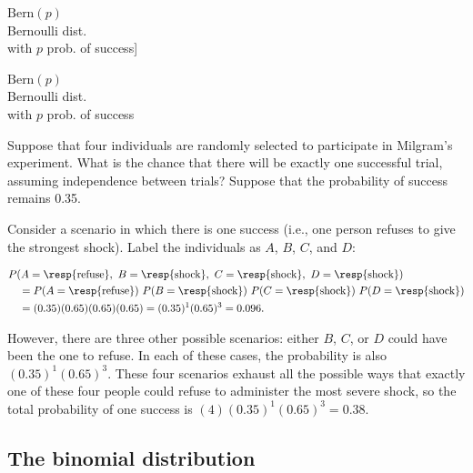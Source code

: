 $\textrm{Bern}(p)$\vspace{1mm}\\\footnotesize Bernoulli dist.\\with $p$ prob. of success]{\raggedright\vspace{-12mm}
	
	$\textrm{Bern}(p)$\vspace{1mm}\\\footnotesize Bernoulli dist.\\with $p$ prob. of success} 


\begin{examplewrap}
\begin{nexample}{Suppose that four individuals are randomly selected to participate in Milgram's experiment. What is the chance that there will be exactly one successful trial, assuming independence between trials? Suppose that the probability of success remains 0.35.}\label{oneRefuser}
	
	Consider a scenario in which there is one success (i.e., one person refuses to give the strongest shock). Label the individuals as $A$, $B$, $C$, and $D$:
	
	\begin{align*}
	&P(A=\text{\resp{refuse}},\text{ }B=\text{\resp{shock}},\text{ }C=\text{\resp{shock}},\text{ }D=\text{\resp{shock}}) \\
	&\quad =  P(A=\text{\resp{refuse}})\ P(B=\text{\resp{shock}})\ P(C=\text{\resp{shock}})\ P(D=\text{\resp{shock}}) \\
	&\quad =  (0.35)  (0.65)  (0.65)  (0.65) = (0.35)^1 (0.65)^3 = 0.096.
	\end{align*}
	
	However, there are three other possible scenarios: either $B$, $C$, or $D$ could have been the one to refuse. In each of these cases, the probability is also $(0.35)^1(0.65)^3$. These four scenarios exhaust all the possible ways that exactly one of these four people could refuse to administer the most severe shock, so the total probability of one success is $(4)(0.35)^1(0.65)^3 = 0.38$.
\end{nexample}
\end{examplewrap}


\textD{\newpage}


\subsection{The binomial distribution}

